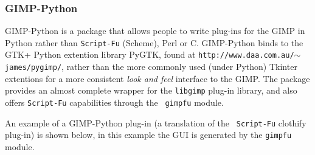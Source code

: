 \documentclass[twoside,11pt]{article}
\newcommand{\htmladdnormallink}[2]{#1}
\newcommand{\latex}[1]{#1}
\begin{document}
\subsubsection{GIMP-Python}

\htmladdnormallink{GIMP-Python}{http://www.daa.com.au/~james/pygimp/}
is a package that allows people to write plug-ins for the GIMP in
Python rather than {\tt Script-Fu} (Scheme), Perl or C. GIMP-Python
binds to the \htmladdnormallink{GTK+}{http://www.gtk.org} Python
extention library
\htmladdnormallink{PyGTK}{http://www.daa.com.au/~james/pygtk/}\latex{,
found at {\tt http://www.daa.com.au/$\sim$james/pygimp/},} rather than
the more commonly used (under Python) Tkinter extentions for a more
consistent {\em look and feel} interface to the GIMP. The package
provides an almost complete wrapper for the {\tt libgimp} plug-in
library, and also offers {\tt Script-Fu} capabilities through the {\tt
gimpfu} module. 

An example of a GIMP-Python plug-in (a translation of the {\tt
Script-Fu} clothify plug-in) is shown below, in this example the GUI
is generated by the {\tt gimpfu} module.
\end{document}
